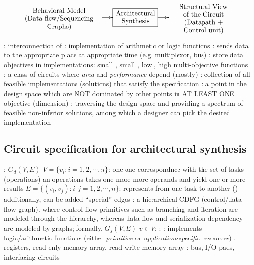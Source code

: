 \documentclass{note}
\begin{document}
\[\xymatrix@-0.7pc{
 \txt<10pc>{Behavioral Model (Data-flow/Sequencing Graphs)} \ar[r] & 
  *+[F]{\txt<5pc>{Architectural Synthesis}} \ar[r] &
 \txt<8pc>{Structural View of the Circuit (Datapath + Control unit)}
}\]
\bit
\w {}: interconnection of 
   \bit
   \w {}: implementation of arithmetic or logic functions
   \w {}: sends data to the appropriate place at appropriate
 time (e.g. multiplexor, bus)
   \w {}: store data
   \eit
\w objectives in implementations:
   small , small , low , high 
   \bit
   \w multi-objective functions
   \eit
\w {}: a class of circuits where {\em area\/} and
   {\em performance} depend (mostly) 
\w {}: collection of all feasible implementations (solutions)
 that satisfy the specification
\w {}: a point in the design space which are NOT dominated by
 other points in AT LEAST ONE objective (dimension)
\w {}: traversing the design space and providing a
 spectrum of feasible non-inferior solutions, among which a designer can pick
 the desired implementation
\eit

\subsection{Circuit specification for architectural synthesis}
\bit
\w {}: $G_d(V, E)$
  \bit
  \w $V = \{v_i: i = 1, 2, \cdots, n\}$: one-one correspondnce with the set of
  tasks (operations)
  \w an operations takes one more more operands and yield one or more results
  \w $E = \{(v_i, v_j): i, j = 1, 2, \cdots, n\}$: represents  from one task to another ()
  \w additionally,  can be added ``special'' edges
  \eit
\w {}: a hierarchical CDFG (control/data flow graph), where
control-flow primitives such as branching and iteration are modeled through
the hierarchy, whereas data-flow and serialization dependency are modeled by
graphs; formally, $G_s(V, E)$
   \bit
   \w $v \in V$: 
   \eit
\w {}:
   \bit
   \w {}: implements logic/arithmetic functions
         (either {\em primitive\/} or {\em application-specific\/} resources)
   \w {}: registers, read-only memory array, read-write
   memory array
   \w {}: bus, I/O pads, interfacing circuits
   \eit
\w 
\eit
\end{document}
